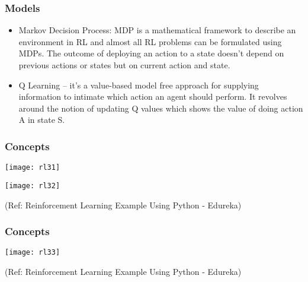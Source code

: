 \begin{frame}[fragile]\frametitle{Models}

\begin{itemize}
\item Markov Decision Process: MDP is a mathematical framework to describe an environment in RL and almost all RL problems can be formulated using MDPs. The outcome of deploying an action to a state doesn’t depend on previous actions or states but on current action and state.
\item Q Learning – it’s a value-based model free approach for supplying information to intimate which action an agent should perform. It revolves around the notion of updating Q values which shows the value of doing action A in state S.
\end{itemize}


\end{frame}


\begin{frame}[fragile]\frametitle{Concepts}
\begin{center}
\texttt{[image: rl31]}

\texttt{[image: rl32]}

\end{center}

{\tiny (Ref: Reinforcement Learning Example Using Python - Edureka)}

\end{frame}

\begin{frame}[fragile]\frametitle{Concepts}
\begin{center}
\texttt{[image: rl33]}

\end{center}

{\tiny (Ref: Reinforcement Learning Example Using Python - Edureka)}

\end{frame}


